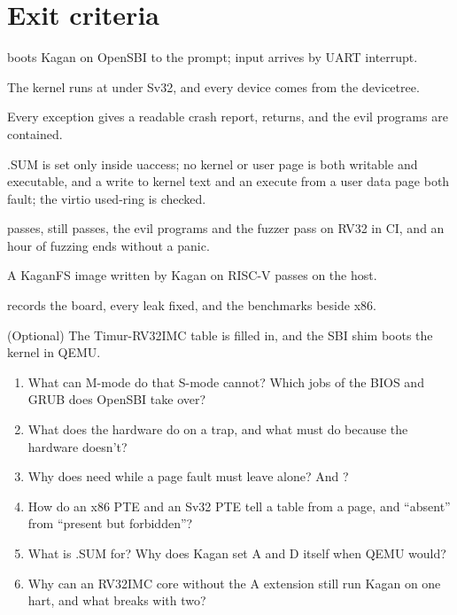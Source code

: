 \documentclass[11pt,a4paper]{article}
\begin{document}
\section{Exit criteria}

\begin{milestonebox}
\begin{checklist}
  \item {} boots Kagan on OpenSBI to the  prompt; input arrives by
    UART interrupt.
  \item The kernel runs at  under Sv32, and every device comes from the devicetree.
  \item Every exception gives a readable crash report,  returns, and the evil programs are contained.
  \item {}.SUM is set only inside uaccess; no kernel or user page is both writable and executable, and a
    write to kernel text and an execute from a user data page both fault; the virtio used-ring  is checked.
  \item {} passes,  still passes, the evil programs and the
    fuzzer pass on RV32 in CI, and an hour of fuzzing ends without a panic.
  \item A KaganFS image written by Kagan on RISC-V passes  on the host.
  \item {} records the board, every leak fixed, and the benchmarks beside x86.
  \item (Optional) The Timur-RV32IMC table is filled in, and the SBI shim boots the kernel in QEMU.
\end{checklist}
\end{milestonebox}

\begin{questionbox}
\begin{enumerate}
  \item What can M-mode do that S-mode cannot? Which jobs of the BIOS and GRUB does OpenSBI take over?
  \item What does the hardware do on a trap, and what must  do because the hardware doesn't?
  \item Why does  need  while a page fault must leave  alone? And ?
  \item How do an x86 PTE and an Sv32 PTE tell a table from a page, and ``absent'' from ``present but forbidden''?
  \item What is .SUM for? Why does Kagan set A and D itself when QEMU would?
  \item Why can an RV32IMC core without the A extension still run Kagan on one hart, and what breaks with two?
\end{enumerate}
\end{questionbox}
\end{document}

